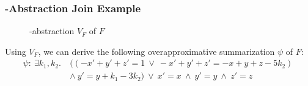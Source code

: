 
\begin{frame}[c]
	\frametitle{\qvasr-Abstraction Join Example}
	\begin{center}
		\begin{figure}
			
			\caption*{\qvasr-abstraction $V_F$ of $F$}
		\end{figure}
	\end{center}
	\pause
	\begin{center}
	Using $V_F$, we can derive the following overapproximative summarization $\psi$ of $F$:
	\begin{align*}
	 \psi: \	\exists k_1, k_2.\ &((-x' + y' + z' = 1\ \lor\ -x' + y' + z' = -x + y + z - 5k_2)\ \\ &\land\ y' = y + k_1 - 3k_2)\ \lor\ x' = x\ \land\ y' = y\ \land\ z' = z
	\end{align*}
	\end{center}
\end{frame}
